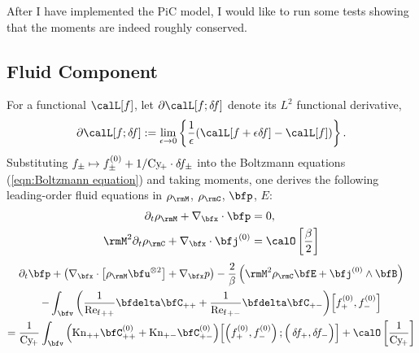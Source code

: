     \begin{remark}
        After I have implemented the PiC model, I would like to run some tests showing that the moments are indeed roughly conserved.
    \end{remark}

    \line

    \subsection*{Fluid Component}
        For a functional $\calL[f]$, let $\partial\calL[f; \delta\!f]$ denote its $L^{2}$ functional derivative,
        \begin{equation}
            \partial\calL[f; \delta\!f]  :=  \lim_{\epsilon \rightarrow 0}\left\{\frac{1}{\epsilon}(\calL[f + \epsilon\delta\!f] - \calL[f])\right\}.
        \end{equation}
        Substituting $f_{\pm}  \mapsto  f_{\pm}^{(0)} + 1/\mathrm{Cy}\!_{+}\cdot\delta\!f_{\pm}$ into the Boltzmann equations (\ref{eqn:Boltzmann equation}) and taking moments, one derives the following leading-order fluid equations in $\rho_{\rmM}$, $\rho_{\rmC}$, $\bfp$, $E$:
        \begin{align}
            \partial_{t}\rho_{\rmM} + \nabla_{\bfx}\cdot\bfp  &=  0,  \label{eqn:PiC-coupled mass conservation}  \\
            \rmM^{2}\partial_{t}\rho_{\rmC} + \nabla_{\bfx}\cdot\bfj^{(0)}  &=  \calO\left[\frac{\beta}{2}\right]  \label{eqn:PiC-coupled charge conservation}
        \end{align}
        \vspace{-20pt}
        \begin{multline}
            \partial_{t}\bfp + \left(\nabla_{\bfx}\cdot\left[\rho_{\rmM}\bfu^{\otimes 2}\right] + \nabla_{\bfx}p\right) - \frac{2}{\beta}\left(\rmM^{2}\rho_{\rmC}\bfE + \bfj^{(0)}\wedge\bfB\right) \\
            - \int_{\bfv}\left(\frac{1}{{\rmRef}_{++}}\bfdelta\bfC_{++} + \frac{1}{{\rmRef}_{+-}}\bfdelta\bfC_{+-}\right)\!\left[f_{+}^{(0)}, f_{-}^{(0)}\right]  \\
            =  \frac{1}{\rmCy\!_{+}}\int_{\bfv}\left(\rmKn_{++}\bfC_{++}^{(0)} + \rmKn_{+-}\bfC_{+-}^{(0)}\right)\!\left[\left(f_{+}^{(0)}, f_{-}^{(0)}\right); \left({\color{white} f_{+}^{(0)}}\!\!\!\!\!\!\!\!\!\delta\!f_{+}, \delta\!f_{-}\right)\right] + \calO\left[\frac{1}{\rmCy\!_{+}}\right]
        \end{multline}
